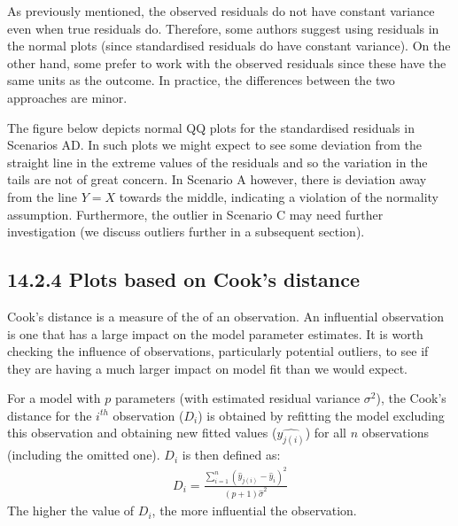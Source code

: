 \documentclass[letterpaper,10pt,english]{jupyterBook}
\let\sphinxpxdimen\pdfpxdimen\else\newdimen\sphinxpxdimen
\begin{document}
\sphinxAtStartPar
As previously mentioned, the observed residuals do not have constant variance even when true residuals do. Therefore, some authors suggest using  residuals in the normal plots (since standardised residuals do have constant variance). On the other hand, some prefer to work with the observed residuals since these have the same units as the outcome. In practice, the differences between the two approaches are minor.

\sphinxAtStartPar
The figure below depicts normal Q\sphinxhyphen{}Q plots for the standardised residuals in Scenarios A\sphinxhyphen{}D. In such plots we might expect to see some deviation from the straight line in the extreme values of the residuals and so the variation in the tails are not of great concern. In Scenario A however, there is deviation away from the line \(Y=X\) towards the middle, indicating a violation of the normality assumption. Furthermore, the outlier in Scenario C may need further investigation (we discuss outliers further in a subsequent section).

\begin{figure}[htbp]
\centering

\noindent\sphinxincludegraphics[height=600\sphinxpxdimen]{{qqplots}.png}
\end{figure}


\subsection{14.2.4  Plots based on Cook’s distance}
\label{\detokenize{14.c. Linear Regression III:plots-based-on-cook-s-distance}}
\sphinxAtStartPar
Cook’s distance is a measure of the  of an observation. An influential observation is one that has a large impact on the model parameter estimates. It is worth checking the influence of observations, particularly potential outliers, to see if they are having a much larger impact on model fit than we would expect.

\sphinxAtStartPar
For a model with \(p\) parameters (with estimated residual variance \(\sigma^2\)), the Cook’s distance for the \(i^{th}\) observation (\(D_i\)) is obtained by refitting the model excluding this observation and obtaining new fitted values (\(\hat{y_{j(i)}}\)) for all \(n\) observations (including the omitted one). \(D_i\) is then defined as:
\begin{equation*}
\begin{split}D_i = \frac{\sum_{i=1}^n(\hat{y}_{j(i)}-\hat{y}_i)^2}{(p+1)\hat{\sigma}^2}\end{split}
\end{equation*}
\sphinxAtStartPar
The higher the value of \(D_i\), the more influential the observation.
\end{document}
